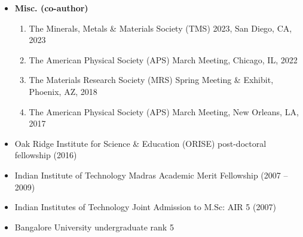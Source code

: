 \documentclass[11pt]{article}
\begin{document}
\begin{itemize}
\begin{enumerate}
        \end{enumerate}
    \item \textbf{Misc. (co-author)}
        \begin{enumerate}
            \item The Minerals, Metals \& Materials Society (TMS) 2023, San Diego, CA, 2023 \href{http://www.programmaster.org/PM/PM.nsf/ApprovedAbstracts/912AB7805FD2229985258880005D2130?OpenDocument}{}
            \item The American Physical Society (APS) March Meeting, Chicago, IL, 2022 \href{https://meetings.aps.org/Meeting/MAR22/Session/S31.2}{}
            \item The Materials Research Society (MRS) Spring Meeting \& Exhibit, Phoenix, AZ, 2018 \href{https://www.mrs.org/spring-2018-symposium-sessions-detail?code=CM03}{}
            \item The American Physical Society (APS) March Meeting, New Orleans, LA, 2017 \href{https://meetings.aps.org/Meeting/MAR17/Session/V12.6}{} \href{http://meetings.aps.org/link/BAPS.2017.MAR.G1.156}{}
        \end{enumerate}
\end{itemize} 

\begin{itemize}
    \item Oak Ridge Institute for Science \& Education (ORISE) post-doctoral fellowship (2016)
    \item Indian Institute of Technology Madras Academic Merit Fellowship (2007 -- 2009)
    \item Indian Institutes of Technology Joint Admission to M.Sc: AIR 5 (2007)
    \item Bangalore University undergraduate rank 5 
\end{itemize} 
\end{document}
